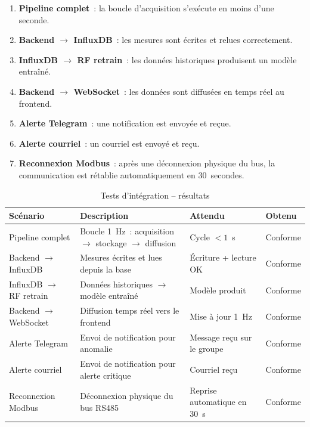 \begin{enumerate}
  \item \textbf{Pipeline complet}~: la boucle d'acquisition s'exécute en moins d'une seconde.
  \item \textbf{Backend \(\rightarrow\) InfluxDB}~: les mesures sont écrites et relues correctement.
  \item \textbf{InfluxDB \(\rightarrow\) RF retrain}~: les données historiques produisent un modèle entraîné.
  \item \textbf{Backend \(\rightarrow\) WebSocket}~: les données sont diffusées en temps réel au frontend.
  \item \textbf{Alerte Telegram}~: une notification est envoyée et reçue.
  \item \textbf{Alerte courriel}~: un courriel est envoyé et reçu.
  \item \textbf{Reconnexion Modbus}~: après une déconnexion physique du bus, la communication est rétablie automatiquement en 30~secondes.
\end{enumerate}

\begin{table}[htbp]
\centering
\renewcommand{\arraystretch}{1.45}
\caption{Tests d'intégration -- résultats}
\label{tab:tests_integration}
\begin{tabular}{|p{}|p{}|p{}|p{}|}
\hline
\rowcolor{gray!25}
\textbf{Scénario} & \textbf{Description} & \textbf{Attendu} & \textbf{Obtenu} \\
\hline
Pipeline complet & Boucle 1~Hz~: acquisition \(\rightarrow\) stockage \(\rightarrow\) diffusion & Cycle \(<1\)~s & Conforme \\
\hline
Backend \(\rightarrow\) InfluxDB & Mesures écrites et lues depuis la base & Écriture + lecture OK & Conforme \\
\hline
InfluxDB \(\rightarrow\) RF retrain & Données historiques \(\rightarrow\) modèle entraîné & Modèle produit & Conforme \\
\hline
Backend \(\rightarrow\) WebSocket & Diffusion temps réel vers le frontend & Mise à jour 1~Hz & Conforme \\
\hline
Alerte Telegram & Envoi de notification pour anomalie & Message reçu sur le groupe & Conforme \\
\hline
Alerte courriel & Envoi de notification pour alerte critique & Courriel reçu & Conforme \\
\hline
Reconnexion Modbus & Déconnexion physique du bus RS485 & Reprise automatique en 30~s & Conforme \\
\hline
\end{tabular}
\end{table}

